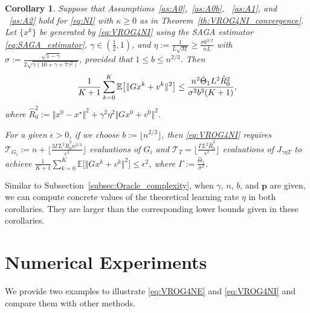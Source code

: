 \documentclass{article}
\newcommand{\sets}[1]{\{#1\}}
\newcommand{\norms}[1]{\Vert#1\Vert}
\newcommand{\Expk}[1]{\mathbb{E}\big[#1\big]}
\newcommand{\Tc}{\mathcal{T}}
\newcommand{\mbf}[1]{\mathbf{#1}}
\newcommand{\beforesec}{\vspace{-1.5ex}}
\newcommand{\aftersec}{\vspace{-1.25ex}}
\newcommand{\beforesubsec}{\vspace{-1.5ex}}
\theoremstyle{plain}
\newtheorem{corollary}[theorem]{Corollary}
\theoremstyle{definition}
\theoremstyle{remark}
\begin{document}
\begin{corollary}\label{co:VROG2_SAGA_convergence1_v3}
Suppose that Assumptions~\ref{as:A0},~\ref{as:A0b}, ~\ref{as:A1}, and ~\ref{as:A2} hold for \eqref{eq:NI} with $\kappa \geq 0$ as in Theorem~\ref{th:VROG4NI_convergence}.
Let $\sets{x^k}$ be generated by \eqref{eq:VROG4NI} using the SAGA estimator \eqref{eq:SAGA_estimator}, $\gamma \in \left( \frac{1}{2}, 1\right)$, and $\eta := \frac{1}{L\sqrt{M}} \geq \frac{\sigma b^{3/2}}{nL}$ with $\sigma := \frac{\sqrt{1-\gamma}}{2\sqrt{\gamma(10+\gamma+7\gamma^2)}}$, provided that $1 \leq b \leq n^{2/3}$.
Then 
\vspace{-1ex}
\begin{equation}\label{eq:saga_bound_for_NI} 
\frac{1}{K+1}\sum_{k=0}^{K} \Expk{ \norms{Gx^{k} + v^k}^2 }   \leq     \frac{n^2 \hat{\Theta}_1 L^2 \hat{R}^2_0 }{\sigma^2b^3 (K + 1)},  
\vspace{-1ex}
\end{equation}
where $\hat{R}^2_0 := \norms{x^0 - x^{\star}}^2 + \gamma^2\eta^2 \norms{Gx^0 + v^0}^2$.

For a given $\epsilon > 0$, if we choose $b := \lfloor n^{2/3} \rfloor$, then \eqref{eq:VROG4NI} requires $\Tc_{G_i} := n + \big\lfloor \frac{3\Gamma L^2\hat{R}^2_0 n^{2/3}}{\varepsilon^2} \big\rfloor$ evaluations of $G_i$ and $\Tc_{T} = \big\lfloor \frac{\Gamma L^2\hat{R}_0^2}{\epsilon^2} \big\rfloor$ evaluations of $J_{\gamma\eta T}$   to achieve $\frac{1}{K+1}\sum_{k=0}^{K} \Expk{ \norms{Gx^{k}+v^k}^2 } \leq \epsilon^2$, where $\Gamma := \frac{\hat{\Theta}_1}{\sigma^2}$.
\end{corollary}
Similar to Subsection~\ref{subsec:Oracle_complexity}, when $\gamma$, $n$, $b$, and $\mbf{p}$ are given, we can compute concrete values of the theoretical learning rate $\eta$ in both corollaries.
They are larger than the corresponding lower bounds given in these corollaries.

\beforesec
\section{Numerical Experiments}\label{sec:NumExps}
\aftersec
We provide two examples to illustrate \eqref{eq:VROG4NE} and \eqref{eq:VROG4NI} and compare them with other methods.

\beforesubsec
\end{document}
